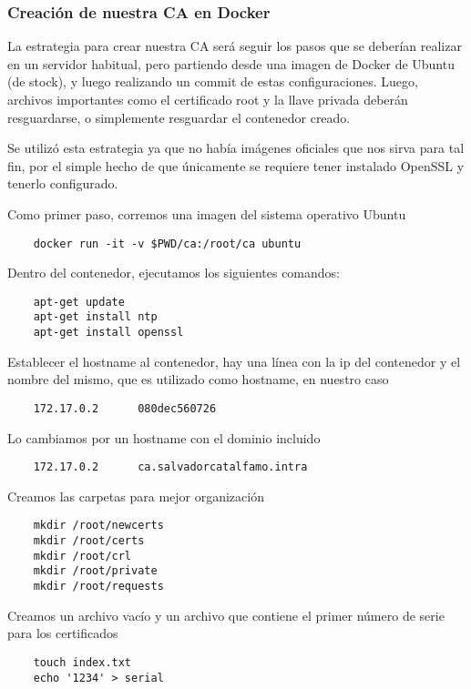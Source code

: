 \subsubsection*{Creación de nuestra CA en Docker}

La estrategia para crear nuestra CA será seguir los pasos que se deberían realizar en un servidor 
habitual, pero partiendo desde una imagen de Docker de Ubuntu (de stock), y luego realizando un 
commit de estas configuraciones. Luego, archivos importantes como el certificado root y la llave
privada deberán resguardarse, o simplemente resguardar el contenedor creado. 

Se utilizó esta estrategia ya que no había imágenes oficiales que nos sirva para tal fin, por el 
simple hecho de que únicamente se requiere tener instalado OpenSSL y tenerlo configurado.

\noindent Como primer paso, corremos una imagen del sistema operativo Ubuntu

\begin{verbatim}
    docker run -it -v $PWD/ca:/root/ca ubuntu
\end{verbatim}

\noindent Dentro del contenedor, ejecutamos los siguientes comandos:
\begin{verbatim}
    apt-get update
    apt-get install ntp
    apt-get install openssl
\end{verbatim}

\noindent Establecer el hostname al contenedor, hay una línea con la ip del contenedor y el nombre del mismo, 
que es utilizado como hostname, en nuestro caso
\begin{verbatim}
    172.17.0.2      080dec560726
\end{verbatim}

\noindent Lo cambiamos por un hostname con el dominio incluido
\begin{verbatim}
    172.17.0.2      ca.salvadorcatalfamo.intra
\end{verbatim}

\noindent Creamos las carpetas para mejor organización
\begin{verbatim}
    mkdir /root/newcerts
    mkdir /root/certs
    mkdir /root/crl
    mkdir /root/private
    mkdir /root/requests
\end{verbatim}

\noindent Creamos un archivo vacío y un archivo que contiene el primer número de serie para los certificados 
\begin{verbatim}
    touch index.txt
    echo '1234' > serial
\end{verbatim}

